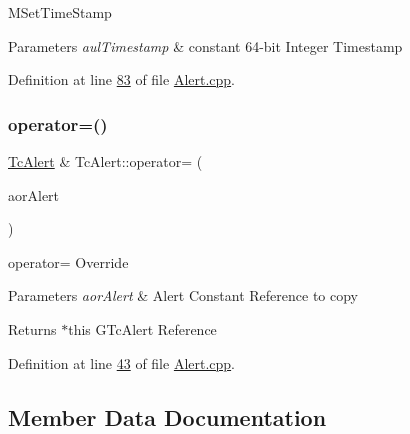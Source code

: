 M\+Set\+Time\+Stamp 
\begin{DoxyParams}{Parameters}
{\em aul\+Timestamp} & constant 64-\/bit Integer Timestamp \\
\hline
\end{DoxyParams}


Definition at line \mbox{\hyperlink{_alert_8cpp_source_l00083}{83}} of file \mbox{\hyperlink{_alert_8cpp_source}{Alert.\+cpp}}.

\mbox{\label{class_g_n_common_1_1_n_notification_1_1_tc_alert_ad1371ff2988283b60a47c2879e1a0011}} 
\subsubsection{\texorpdfstring{operator=()}{operator=()}}
{\footnotesize\ttfamily \mbox{\hyperlink{class_g_n_common_1_1_n_notification_1_1_tc_alert}{Tc\+Alert}} \& Tc\+Alert\+::operator= (\begin{DoxyParamCaption}\item[{const \mbox{\hyperlink{class_g_n_common_1_1_n_notification_1_1_tc_alert}{Tc\+Alert}} \&}]{aor\+Alert }\end{DoxyParamCaption})}

operator= Override 
\begin{DoxyParams}{Parameters}
{\em aor\+Alert} & Alert Constant Reference to copy \\
\hline
\end{DoxyParams}
\begin{DoxyReturn}{Returns}
$\ast$this G\+Tc\+Alert Reference 
\end{DoxyReturn}


Definition at line \mbox{\hyperlink{_alert_8cpp_source_l00043}{43}} of file \mbox{\hyperlink{_alert_8cpp_source}{Alert.\+cpp}}.



\subsection{Member Data Documentation}
\mbox{\label{class_g_n_common_1_1_n_notification_1_1_tc_alert_aa42573703fd6fa2ba90aa010fdc659ca}} 
